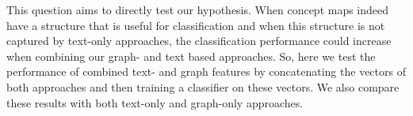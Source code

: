 This question aims to directly test our hypothesis. 
When concept maps indeed have a structure that is useful for classification and when this structure is not captured by text-only approaches, the classification performance could increase when combining our graph- and text based approaches.
So, here we test the performance of combined text- and graph features by concatenating the vectors of both approaches and then training a classifier on these vectors.
We also compare these results with both text-only and graph-only approaches.